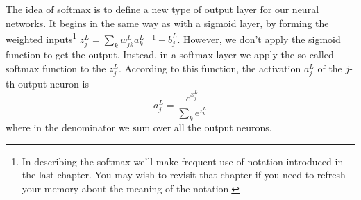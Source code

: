 \documentclass[a4paper,twoside,10pt]{book}
\begin{document}
The idea of softmax is to define a new type of output layer for our neural networks. It begins in the same way as with a sigmoid layer, by forming the weighted inputs\footnote{In describing the softmax we'll make frequent use of notation introduced in the last chapter. You may wish to revisit that chapter if you need to refresh your memory about the meaning of the notation.} $z^L_j=\sum_kw^L_{jk}a^{L-1}_k+b^L_j$. However, we don't apply the sigmoid function to get the output. Instead, in a softmax layer we apply the so-called softmax function to the $z^L_j$. According to this function, the activation $a^L_j$ of the $j$-th output neuron is
\begin{equation}
	a^L_j = \frac{e^{x^L_j}}{\sum_ke^{z^L_k}}
	\label{eq:78}
\end{equation}
where in the denominator we sum over all the output neurons.
\end{document}
